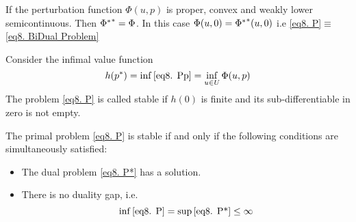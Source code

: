  	If the perturbation function $\Phi(u,p)$ is proper, convex and weakly lower semicontinuous. Then ${{\Phi}^{\ast}}^{\ast}=\Phi$. In this case $\Phi (u, 0) ={{\Phi}^{\ast}}^{\ast}(u, 0)$ i.e \eqref{eq8. P}$\equiv$ \eqref{eq8. BiDual Problem}

  \begin{definition}
  		Consider the infimal value function
  		\[
  		h({p}^{\ast})=\inf \eqref{eq8. Pp} = \inf_{u \in U} \Phi(u,p)
  		\]
  	The problem \eqref{eq8. P} is called stable if $h(0)$ is finite and its sub-differentiable in zero is not empty.
  	\end{definition}
  	
  \begin{theorem}
  	The primal problem \eqref{eq8. P} is stable 
  	if and only if the following conditions are simultaneously satisfied:
  	\begin{itemize}
  		\item The dual problem \eqref{eq8. P*} has a solution.
  		\item There is no duality gap, i.e.
  		\[ 
	  		\inf\eqref{eq8. P}= \sup\eqref{eq8. P*} \leq\infty
  		\]
  	\end{itemize}
 \end{theorem}	

